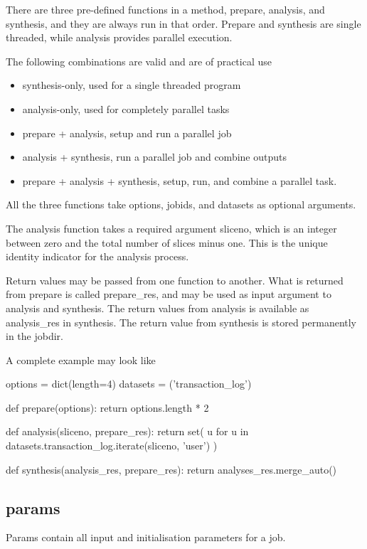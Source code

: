 There are three pre-defined functions in a method, prepare, analysis,
and synthesis, and they are always run in that order.  Prepare and
synthesis are single threaded, while analysis provides parallel
execution.

The following combinations are valid and are of practical use
\begin{itemize}
\item synthesis-only, used for a single threaded program
\item analysis-only, used for completely parallel tasks
\item prepare + analysis, setup and run a parallel job
\item analysis + synthesis, run a parallel job and combine outputs
\item prepare + analysis + synthesis, setup, run, and combine a
  parallel task.
\end{itemize}

All the three functions take options, jobids, and datasets as optional
arguments.

The analysis function takes a required argument sliceno, which is an
integer between zero and the total number of slices minus one.  This
is the unique identity indicator for the analysis process.

Return values may be passed from one function to another.  What is
returned from prepare is called prepare\_res, and may be used as input
argument to analysis and synthesis.  The return values from analysis
is available as analysis\_res in synthesis.  The return value from
synthesis is stored permanently in the jobdir.

A complete example may look like

\begin{python}
options = dict(length=4)
datasets = ('transaction_log')

def prepare(options):
  return options.length * 2

def analysis(sliceno, prepare_res):
  return set(
    u for u in datasets.transaction_log.iterate(sliceno, 'user')
  )

def synthesis(analysis_res, prepare_res):
   return analyses_res.merge_auto()
\end{python}


\subsection{params}
Params contain all input and initialisation parameters for a job.

